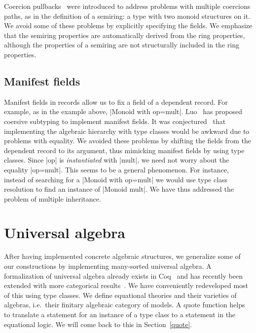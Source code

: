 \documentclass[a4paper,10pt, runningheads]{llncs}
\begin{document}
Coercion pullbacks~\cite{Hints} were introduced to address problems with multiple coercions paths,
as in the definition of a semiring: a type with two monoid structures on it. We avoid some
of these problems by explicitly specifying the fields. We emphasize that the semiring properties are automatically derived from the ring
properties, although the properties of a semiring are not structurally included in the ring
properties.

\subsection{Manifest fields}\label{manifest}

Manifest fields in records allow us to fix a field of a dependent record. For example, as in the
example above, |Monoid with op=mult|. 
Luo~\cite{DBLP:conf/types/Luo08} has proposed coersive subtyping to implement manifest fields.
It was conjectured~\cite{Hints} that implementing the algebraic hierarchy with type classes would
be awkward due to problems with equality. We avoided these problems by shifting the fields
from the dependent record to its argument, thus mimicking manifest fields by using type classes.
Since |op| is \emph{instantiated} with |mult|, we need not worry about the
equality |op=mult|. This seems to be a general phenomenon. For instance, instead of searching
for a |Monoid with op=mult| we would use type class resolution to find an instance of |Monoid mult|.
We have thus addressed the problem of multiple inheritance.

\section{Universal algebra}\label{univ}
After having implemented concrete algebraic structures, we generalize some of our constructions
by implementing many-sorted universal algebra. A formalization of universal algebra
already exists in Coq~\cite{DBLP:conf/tphol/Capretta99} and has recently been extended with
more categorical results~\cite{dominguez2008formalizing}. We have conveniently redeveloped most of
this using type classes. We define equational theories and their varieties of algebras, i.e.\ their
finitary algebraic category of models. A quote function helps to translate a statement for an
instance of
a type class to a statement in the equational logic. We will come back to this in
Section~\ref{quote}.

\end{document}
